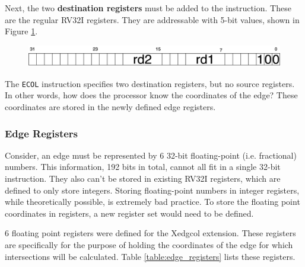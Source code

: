     Next, the two \textbf{destination registers} must be added to the instruction. These are the regular RV32I registers. They are addressable with 5-bit values, shown in Figure \ref{fig:instr_rd}. 

    \begin{figure}[H]
    \begin{center}
    \includegraphics[width=0.85\linewidth]{chapters/chapter4/img/instr_rd.png} 
    \label{fig:instr_rd}
    \end{center}
    \end{figure}

    The \texttt{ECOL} instruction specifies two destination registers, but no source registers. In other words, how does the processor know the coordinates of the edge? These coordinates are stored in the newly defined edge registers.

    \subsubsection{Edge Registers}

    Consider, an edge must be represented by 6 32-bit floating-point (i.e. fractional) numbers. This information, 192 bits in total, cannot all fit in a single 32-bit instruction. They also can't be stored in existing RV32I registers, which are defined to only store integers. Storing floating-point numbers in integer registers, while theoretically possible, is extremely bad practice. To store the floating point coordinates in registers, a new register set would need to be defined.

    6 floating point registers were defined for the Xedgcol extension. These registers are specifically for the purpose of holding the coordinates of the edge for which intersections will be calculated. Table \ref{table:edge_registers} lists these registers.

